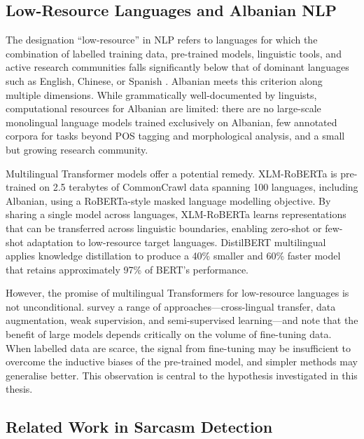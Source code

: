 \documentclass[12pt,a4paper]{article}
\begin{document}
\subsection{Low-Resource Languages and Albanian NLP}
\label{subsec:low_resource}

The designation ``low-resource'' in NLP refers to languages for which the combination of labelled training data, pre-trained models, linguistic tools, and active research communities falls significantly below that of dominant languages such as English, Chinese, or Spanish \citep{hedderich2021survey}. Albanian meets this criterion along multiple dimensions. While grammatically well-documented by linguists, computational resources for Albanian are limited: there are no large-scale monolingual language models trained exclusively on Albanian, few annotated corpora for tasks beyond POS tagging and morphological analysis, and a small but growing research community.

Multilingual Transformer models offer a potential remedy. XLM-RoBERTa \citep{conneau2020unsupervised} is pre-trained on 2.5 terabytes of CommonCrawl data spanning 100 languages, including Albanian, using a RoBERTa-style masked language modelling objective. By sharing a single model across languages, XLM-RoBERTa learns representations that can be transferred across linguistic boundaries, enabling zero-shot or few-shot adaptation to low-resource target languages. DistilBERT multilingual \citep{sanh2019distilbert} applies knowledge distillation to produce a 40\% smaller and 60\% faster model that retains approximately 97\% of BERT's performance.

However, the promise of multilingual Transformers for low-resource languages is not unconditional. \citet{hedderich2021survey} survey a range of approaches---cross-lingual transfer, data augmentation, weak supervision, and semi-supervised learning---and note that the benefit of large models depends critically on the volume of fine-tuning data. When labelled data are scarce, the signal from fine-tuning may be insufficient to overcome the inductive biases of the pre-trained model, and simpler methods may generalise better. This observation is central to the hypothesis investigated in this thesis.

\subsection{Related Work in Sarcasm Detection}
\label{subsec:related_work}
\end{document}
